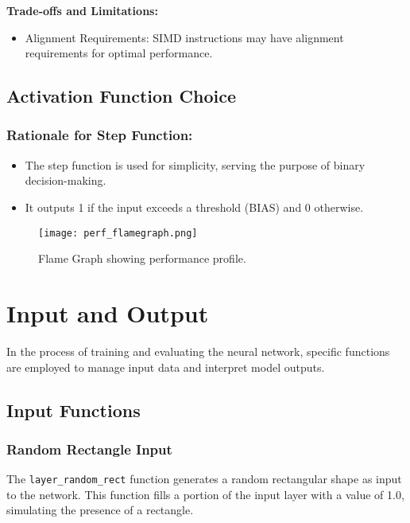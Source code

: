 \documentclass{article}
\begin{document}
\textbf{Trade-offs and Limitations:}
\begin{itemize}
  \item Alignment Requirements: SIMD instructions may have alignment requirements for optimal performance.
\end{itemize}

 \clearpage
 
\subsection{Activation Function Choice}
\subsubsection*{Rationale for Step Function:}
\begin{itemize}
  \item The step function is used for simplicity, serving the purpose of binary decision-making.
  \item It outputs 1 if the input exceeds a threshold (BIAS) and 0 otherwise.
\end{itemize}


\begin{figure}[h]
  \centering
  \texttt{[image: perf\_flamegraph.png]} %
  \caption{Flame Graph showing performance profile.}
  \label{fig:perf_flamegraph}
\end{figure}



\clearpage
\section{Input and Output}

In the process of training and evaluating the neural network, specific functions are employed to manage input data and interpret model outputs.

\subsection{Input Functions}

\subsubsection*{Random Rectangle Input}
The \texttt{layer\_random\_rect} function generates a random rectangular shape as input to the network. This function fills a portion of the input layer with a value of 1.0, simulating the presence of a rectangle.
\end{document}
